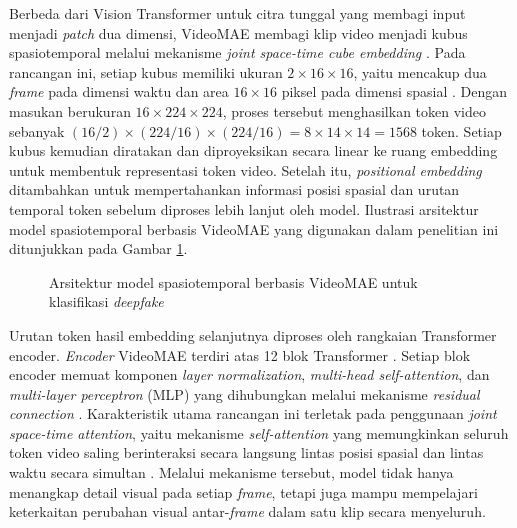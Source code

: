 Berbeda dari Vision Transformer untuk citra tunggal yang membagi input menjadi \textit{patch} dua dimensi, VideoMAE membagi klip video menjadi kubus spasiotemporal melalui mekanisme \textit{joint space-time cube embedding} \cite{tong2022videomaemaskedautoencodersdataefficient}. Pada rancangan ini, setiap kubus memiliki ukuran $2 \times 16 \times 16$, yaitu mencakup dua \textit{frame} pada dimensi waktu dan area $16 \times 16$ piksel pada dimensi spasial \cite{tong2022videomaemaskedautoencodersdataefficient}. Dengan masukan berukuran $16 \times 224 \times 224$, proses tersebut menghasilkan token video sebanyak $(16/2) \times (224/16) \times (224/16) = 8 \times 14 \times 14 = 1568$ token. Setiap kubus kemudian diratakan dan diproyeksikan secara linear ke ruang embedding untuk membentuk representasi token video. Setelah itu, \textit{positional embedding} ditambahkan untuk mempertahankan informasi posisi spasial dan urutan temporal token sebelum diproses lebih lanjut oleh model. Ilustrasi arsitektur model spasiotemporal berbasis VideoMAE yang digunakan dalam penelitian ini ditunjukkan pada Gambar \ref{fig:3.model-videomae}. \par

\begin{figure}[H]
	\centering
	\caption{Arsitektur model spasiotemporal berbasis VideoMAE untuk klasifikasi \textit{deepfake}}
	\label{fig:3.model-videomae}
\end{figure}

Urutan token hasil embedding selanjutnya diproses oleh rangkaian Transformer encoder. \textit{Encoder} VideoMAE terdiri atas 12 blok Transformer \cite{tong2022videomaemaskedautoencodersdataefficient}. Setiap blok encoder memuat komponen \textit{layer normalization}, \textit{multi-head self-attention}, dan \textit{multi-layer perceptron} (MLP) yang dihubungkan melalui mekanisme \textit{residual connection} \cite{tong2022videomaemaskedautoencodersdataefficient}. Karakteristik utama rancangan ini terletak pada penggunaan \textit{joint space-time attention}, yaitu mekanisme \textit{self-attention} yang memungkinkan seluruh token video saling berinteraksi secara langsung lintas posisi spasial dan lintas waktu secara simultan \cite{tong2022videomaemaskedautoencodersdataefficient}. Melalui mekanisme tersebut, model tidak hanya menangkap detail visual pada setiap \textit{frame}, tetapi juga mampu mempelajari keterkaitan perubahan visual antar-\textit{frame} dalam satu klip secara menyeluruh. \par

